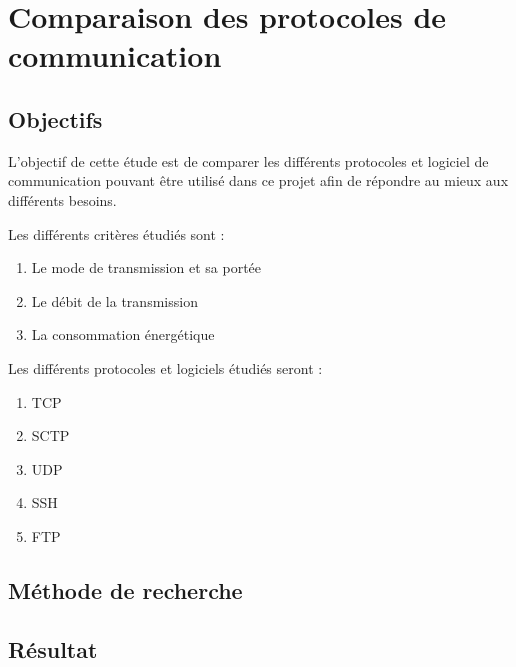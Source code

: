 \section{Comparaison des protocoles de communication}
\label{sec:comparaisonProtocoleCommnunication}

\subsection{Objectifs}
\label{sec:comparaisonProtocoleCommnunicationObjectifs}

L'objectif de cette étude est de comparer les différents protocoles et logiciel de communication
pouvant être utilisé dans ce projet afin de répondre au mieux aux différents besoins.\newline

Les différents critères étudiés sont :

\begin{enumerate}
    \item Le mode de transmission et sa portée
    \item Le débit de la transmission
    \item La consommation énergétique
\end{enumerate}

Les différents protocoles et logiciels étudiés seront :

\begin{enumerate}
    \item \gls{TCP}
    \item \gls{SCTP}
    \item \gls{UDP}
    \item \gls{SSH}
    \item \gls{FTP}
\end{enumerate}

\subsection{Méthode de recherche}
\label{sec:comparaisonProtocoleCommnunicationMethode}


\subsection{Résultat}
\label{sec:comparaisonProtocoleCommnunicationResultats}

\subsubsection{}
\label{sec:tcp}

